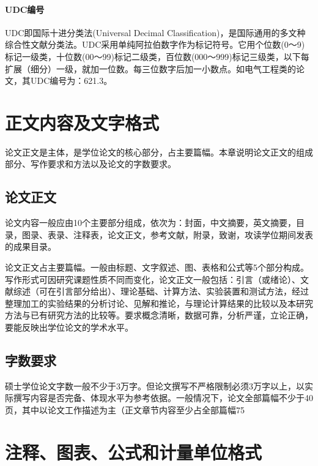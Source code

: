 \documentclass{cqupt_thesis}
\begin{document}
    \subsubsection{UDC编号}
    UDC即国际十进分类法(Universal Decimal Classification)，是国际通用的多文种综合性文献分类法。UDC采用单纯阿拉伯数字作为标记符号。它用个位数(0～9)标记一级类，十位数(00～99)标记二级类，百位数(000～999)标记三级类，以下每扩展（细分）一级，就加一位数。每三位数字后加一小数点。如电气工程类的论文，其UDC编号为：621.3。


    \chapter{正文内容及文字格式}
    论文正文是主体，是学位论文的核心部分，占主要篇幅。本章说明论文正文的组成部分、写作要求和方法以及论文的字数要求。


    \section{论文正文}
    论文内容一般应由10个主要部分组成，依次为：封面，中文摘要，英文摘要，目录，图录、表录、注释表，论文正文，参考文献，附录，致谢，攻读学位期间发表的成果目录。

    论文正文占主要篇幅。一般由标题、文字叙述、图、表格和公式等5个部分构成。写作形式可因研究课题性质不同而变化，论文正文一般包括：引言（或绪论）、文献综述（可在引言部分给出）、理论基础、计算方法、实验装置和测试方法，经过整理加工的实验结果的分析讨论、见解和推论，与理论计算结果的比较以及本研究方法与已有研究方法的比较等。要求概念清晰，数据可靠，分析严谨，立论正确，要能反映出学位论文的学术水平。
    \section{字数要求}
    硕士学位论文字数一般不少于3万字。但论文撰写不严格限制必须3万字以上，以实际撰写内容是否完备、体现水平为参考依据。一般情况下，论文全部篇幅不少于40页，其中以论文工作描述为主（正文章节内容至少占全部篇幅75%
    
    \chapter{注释、图表、公式和计量单位格式}
\end{document}
